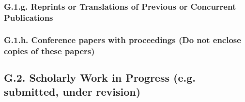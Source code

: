 \documentclass[10pt]{article}
\begin{document}
{


\subsubsection*{G.1.g. Reprints or Translations of Previous or Concurrent Publications}



\subsubsection*{G.1.h. Conference papers with proceedings (Do not enclose copies of these papers)}



\subsection*{G.2. Scholarly Work in Progress (e.g. submitted, under revision)}


}
\end{document}
